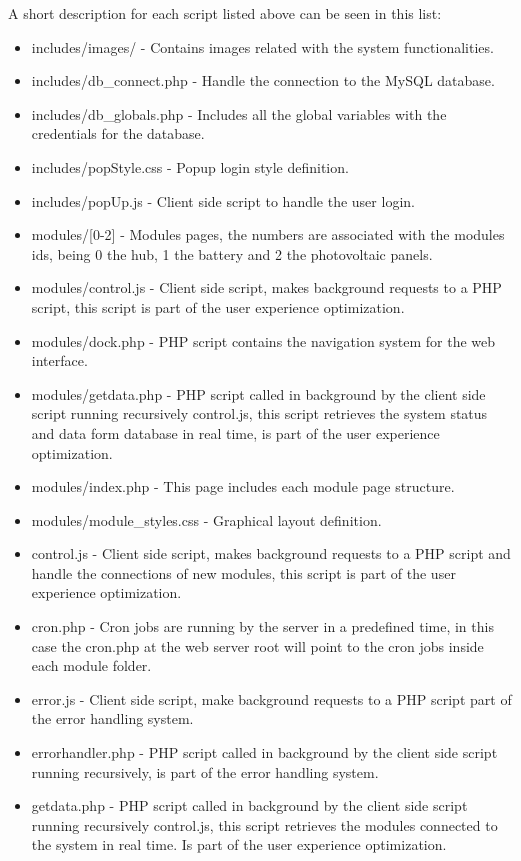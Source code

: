 A short description for each script listed above can be seen in this list:
\begin{itemize}
	\item includes/images/ - Contains images related with the system functionalities.
	\item includes/db\_connect.php - Handle the connection to the MySQL database.
	\item includes/db\_globals.php - Includes all the global variables with the credentials for the database.
	\item includes/popStyle.css - Popup login style definition.
	\item includes/popUp.js - Client side script to handle the user login.
	\item modules/[0-2] - Modules pages, the numbers are associated with the modules ids, being 0 the hub, 1 the battery and 2 the photovoltaic panels.
	\item modules/control.js - Client side script, makes background requests to a PHP script, this script is part of the user experience optimization.
	\item modules/dock.php - PHP script contains the navigation system for the web interface.
	\item modules/getdata.php - PHP script called in background by the client side script running recursively control.js, this script retrieves the system status and data form database in real time, is part of the user experience optimization.
	\item modules/index.php - This page includes each module page structure.
	\item modules/module\_styles.css - Graphical layout definition.
	\item control.js - Client side script, makes background requests to a PHP script and handle the connections of new modules, this script is part of the user experience optimization.
	\item cron.php  - Cron jobs are running by the server in a predefined time, in this case the cron.php at the web server root will point to the cron jobs inside each module folder.
	\item error.js - Client side script, make background requests to a PHP script part of the error handling system.
	\item errorhandler.php - PHP script called in background by the client side script running recursively, is part of the error handling system.
	\item getdata.php - PHP script called in background by the client side script running recursively control.js, this script retrieves the modules connected to the system in real time. Is part of the user experience optimization.

\end{itemize}

